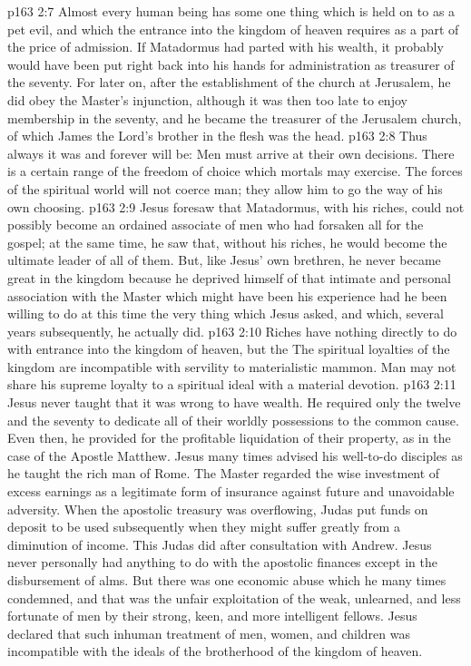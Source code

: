 \pc \vs p163 2:7 Almost every human being has some one thing which is held on to as a pet evil, and which the entrance into the kingdom of heaven requires as a part of the price of admission. If Matadormus had parted with his wealth, it probably would have been put right back into his hands for administration as treasurer of the seventy. For later on, after the establishment of the church at Jerusalem, he did obey the Master’s injunction, although it was then too late to enjoy membership in the seventy, and he became the treasurer of the Jerusalem church, of which James the Lord’s brother in the flesh was the head.
\vs p163 2:8 Thus always it was and forever will be: Men must arrive at their own decisions. There is a certain range of the freedom of choice which mortals may exercise. The forces of the spiritual world will not coerce man; they allow him to go the way of his own choosing.
\vs p163 2:9 Jesus foresaw that Matadormus, with his riches, could not possibly become an ordained associate of men who had forsaken all for the gospel; at the same time, he saw that, without his riches, he would become the ultimate leader of all of them. But, like Jesus’ own brethren, he never became great in the kingdom because he deprived himself of that intimate and personal association with the Master which might have been his experience had he been willing to do at this time the very thing which Jesus asked, and which, several years subsequently, he actually did.
\vs p163 2:10 Riches have nothing directly to do with entrance into the kingdom of heaven, but the  The spiritual loyalties of the kingdom are incompatible with servility to materialistic mammon. Man may not share his supreme loyalty to a spiritual ideal with a material devotion.
\vs p163 2:11 Jesus never taught that it was wrong to have wealth. He required only the twelve and the seventy to dedicate all of their worldly possessions to the common cause. Even then, he provided for the profitable liquidation of their property, as in the case of the Apostle Matthew. Jesus many times advised his well\hyp{}to\hyp{}do disciples as he taught the rich man of Rome. The Master regarded the wise investment of excess earnings as a legitimate form of insurance against future and unavoidable adversity. When the apostolic treasury was overflowing, Judas put funds on deposit to be used subsequently when they might suffer greatly from a diminution of income. This Judas did after consultation with Andrew. Jesus never personally had anything to do with the apostolic finances except in the disbursement of alms. But there was one economic abuse which he many times condemned, and that was the unfair exploitation of the weak, unlearned, and less fortunate of men by their strong, keen, and more intelligent fellows. Jesus declared that such inhuman treatment of men, women, and children was incompatible with the ideals of the brotherhood of the kingdom of heaven.
